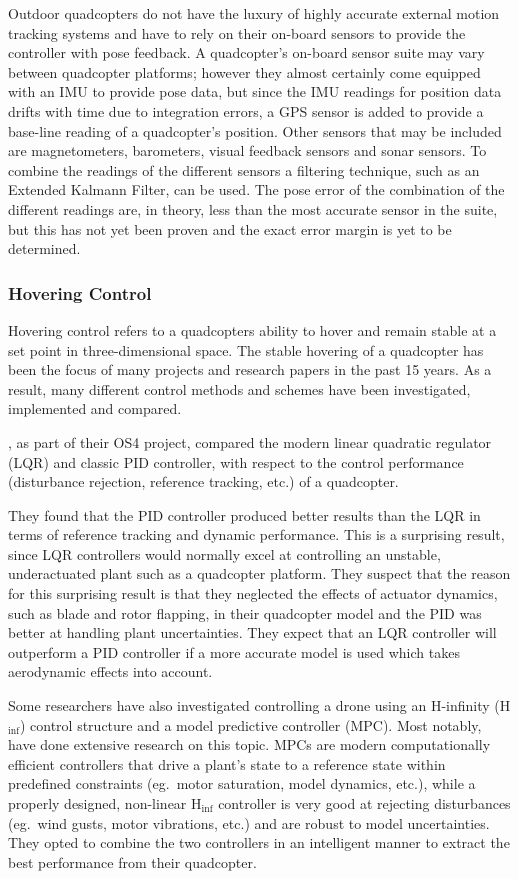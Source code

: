 Outdoor quadcopters do not have the luxury of highly accurate external motion tracking systems and have to rely on their on-board sensors to provide the controller with pose feedback. A quadcopter's on-board sensor suite may vary between quadcopter platforms; however they almost certainly come equipped with an IMU to provide pose data, but since the IMU readings for position data drifts with time due to integration errors, a GPS sensor is added to provide a base-line reading of a quadcopter's position. Other sensors that may be included are magnetometers, barometers, visual feedback sensors and sonar sensors. To combine the readings of the different sensors a filtering technique, such as an Extended Kalmann Filter, can be used. The pose error of the combination of the different readings are, in theory, less than the most accurate sensor in the suite, but this has not yet been proven and the exact error margin is yet to be determined. 

\subsubsection{Hovering Control}

Hovering control refers to a quadcopters ability to hover and remain stable at a set point in three-dimensional space. The stable hovering of a quadcopter has been the focus of many projects and research papers in the past 15 years. As a result, many different control methods and schemes have been investigated, implemented and compared. 

\cite{bouabdallah2004pid}, as part of their OS4 project, compared the modern linear quadratic regulator (LQR) and classic PID controller, with respect to the control performance (disturbance rejection, reference tracking, etc.) of a quadcopter.

They found that the PID controller produced better results than the LQR in terms of reference tracking and dynamic performance. This is a surprising result, since LQR controllers would normally excel at controlling an unstable, underactuated plant such as a quadcopter platform. They suspect that the reason for this surprising result is that they neglected the effects of actuator dynamics, such as blade and rotor flapping, in their quadcopter model and the PID was better at handling plant uncertainties. They expect that an LQR controller will outperform a PID controller if a more accurate model is used which takes aerodynamic effects into account. 

Some researchers have also investigated controlling a drone using an H-infinity (H$_{\inf}$) control structure and a model predictive controller (MPC). Most notably,~\cite{raffo2010integral} have done extensive research on this topic. MPCs are modern computationally efficient controllers that drive a plant's state to a reference state within predefined constraints (eg.\ motor saturation, model dynamics, etc.), while a properly designed, non-linear H$_{\inf}$ controller is very good at rejecting disturbances (eg.\ wind gusts, motor vibrations, etc.) and are robust to model uncertainties. They opted to combine the two controllers in an intelligent manner to extract the best performance from their quadcopter. 

